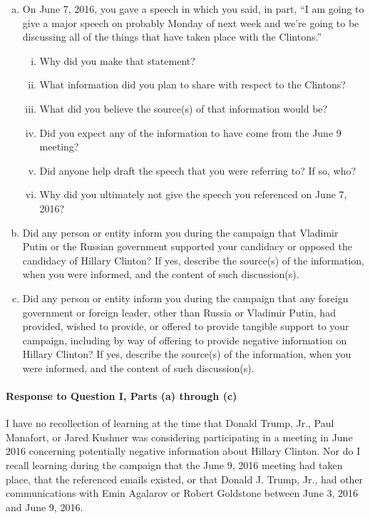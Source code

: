 \begin{enumerate}[a.]
\item On June 7, 2016, you gave a speech in which you said, in part, “I am going to give a major speech on probably Monday of next week and we’re going to be discussing all of the things that have taken place with the Clintons.”

\begin{enumerate}[i.]

\item Why did you make that statement?
\item What information did you plan to share with respect to the Clintons?
\item What did you believe the source(s) of that information would be?
\item Did you expect any of the information to have come from the June 9 meeting?
\item Did anyone help draft the speech that you were referring to? If so, who?
\item Why did you ultimately not give the speech you referenced on June 7, 2016?

\end{enumerate}

\item Did any person or entity inform you during the campaign that Vladimir Putin or the Russian government supported your candidacy or opposed the candidacy of Hillary Clinton?
If yes, describe the source(s) of the information, when you were informed, and the content of such discussion(s).

\item Did any person or entity inform you during the campaign that any foreign government or foreign leader, other than Russia or Vladimir Putin, had provided, wished to provide, or offered to provide tangible support to your campaign, including by way of offering to provide negative information on Hillary Clinton?
If yes, describe the source(s) of the information, when you were informed, and the content of such discussion(s).

\end{enumerate}

\paragraph*{Response to Question I, Parts (a) through (c)}

I have no recollection of learning at the time that Donald Trump, Jr., Paul Manafort, or Jared Kushner was considering participating in a meeting in June 2016 concerning potentially negative information about Hillary Clinton.
Nor do I recall learning during the campaign that the June 9, 2016 meeting had taken place, that the referenced emails existed, or that Donald J. Trump, Jr., had other communications with Emin Agalarov or Robert Goldstone between June 3, 2016 and June 9, 2016.


